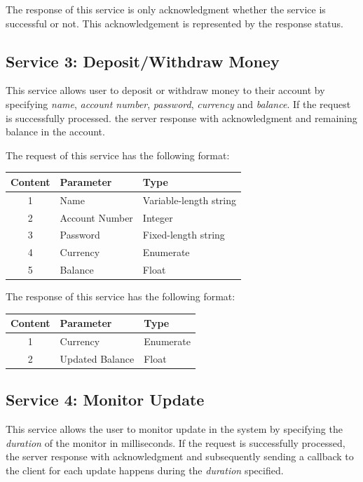 \documentclass[12pt]{article}
\begin{document}
The response of this service is only acknowledgment whether the service is successful or not. This acknowledgement is represented by the response status.

\subsection{Service 3: Deposit/Withdraw Money}
This service allows user to deposit or withdraw money to their account by specifying \textit{name}, \textit{account number}, \textit{password}, \textit{currency} and \textit{balance}. If the request is successfully processed. the server response with acknowledgment and remaining balance in the account.

The request of this service has the following format:

\noindent\begin{minipage}{\linewidth}
	\centering
	\centering
	\begin{tabular}{c l l}
    \hline
    \textbf{Content} & \textbf{Parameter} & \textbf{Type}\\
    \hline
    1 & Name & Variable-length string \\
    2 & Account Number & Integer \\
    3 & Password & Fixed-length string \\
    4 & Currency & Enumerate \\
    5 & Balance & Float \\
    \hline
	\end{tabular}
\end{minipage}

The response of this service has the following format:

\noindent\begin{minipage}{\linewidth}
	\centering
	\begin{tabular}{c l l}
  	\hline
    \textbf{Content} & \textbf{Parameter} & \textbf{Type}\\
    \hline
    1 & Currency & Enumerate \\
    2 & Updated Balance & Float \\
    \hline
	\end{tabular}
\end{minipage}

\subsection{Service 4: Monitor Update}
This service allows the user to monitor update in the system by specifying the \textit{duration} of the monitor in milliseconds. If the request is successfully processed, the server response with acknowledgment and subsequently sending a callback to the client for each update happens during the \textit{duration} specified.
\end{document}
